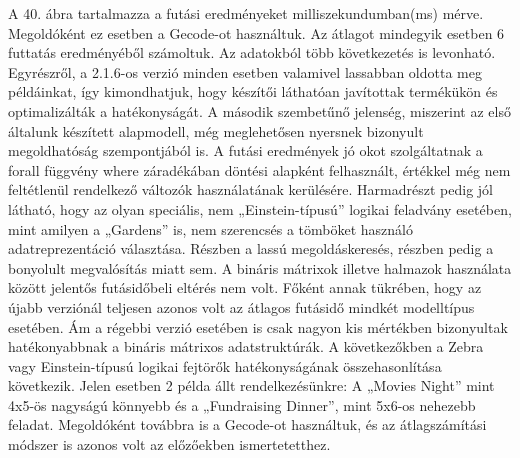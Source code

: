 \documentclass[12pt,a4paper,twoside, openright]{report}
\begin{document}
			
			A 40. ábra tartalmazza a futási eredményeket milliszekundumban(ms) mérve. Megoldóként ez esetben a Gecode-ot használtuk. Az átlagot mindegyik esetben 6 futtatás eredményéből számoltuk. Az adatokból több következetés is levonható.
			Egyrészről, a 2.1.6-os verzió minden esetben valamivel lassabban oldotta meg példáinkat, így kimondhatjuk, hogy készítői láthatóan javítottak termékükön és optimalizálták a hatékonyságát.
			A második szembetűnő jelenség, miszerint az első általunk készített alapmodell, még meglehetősen nyersnek bizonyult megoldhatóság szempontjából is. A futási eredmények jó okot szolgáltatnak a forall függvény where záradékában döntési alapként felhasznált, értékkel még nem feltétlenül rendelkező változók használatának kerülésére. 
			Harmadrészt pedig jól látható, hogy az olyan speciális, nem „Einstein-típusú” logikai feladvány esetében, mint amilyen a „Gardens” is, nem szerencsés a tömböket használó adatreprezentáció választása. Részben a lassú megoldáskeresés, részben pedig a bonyolult megvalósítás miatt sem.
			A bináris mátrixok illetve halmazok használata között jelentős futásidőbeli eltérés nem volt. Főként annak tükrében, hogy az újabb verziónál teljesen azonos volt az átlagos futásidő mindkét modelltípus esetében. Ám a régebbi verzió esetében is csak nagyon kis mértékben bizonyultak hatékonyabbnak a bináris mátrixos adatstruktúrák.
			A következőkben a Zebra vagy Einstein-típusú logikai fejtörők hatékonyságának 
			összehasonlítása következik. Jelen esetben 2 példa állt rendelkezésünkre: A „Movies 
			Night” mint 4x5-ös nagyságú könnyebb és a „Fundraising Dinner”, mint 5x6-os nehezebb 
			feladat. Megoldóként továbbra is a Gecode-ot használtuk, és az átlagszámítási módszer 
			is azonos volt az előzőekben ismertetetthez.
			
			
\end{document}
